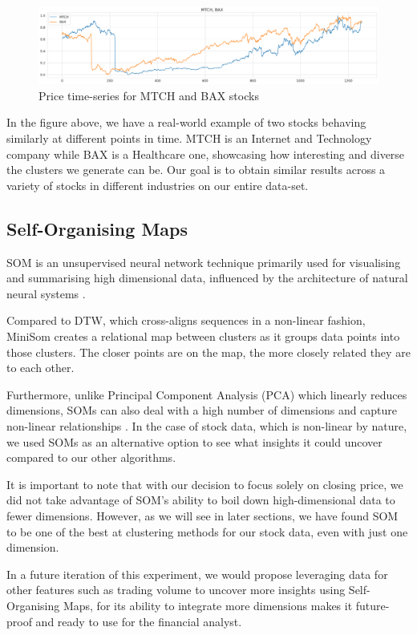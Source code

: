 \documentclass[11pt]{article}
\begin{document}
\begin{figure}[H] 
\centering
\includegraphics[width=12cm]{img/mtch-bax.png} 
\caption{Price time-series for MTCH and BAX stocks}
\label{fig:mtch-bax}
\end{figure}

In the figure above, we have a real-world example of two stocks behaving similarly at different points in time. MTCH is an Internet and Technology company while BAX is a Healthcare one, showcasing how interesting and diverse the clusters we generate can be. Our goal is to obtain similar results across a variety of stocks in different industries on our entire data-set. 

\subsection{Self-Organising Maps}

 SOM is an unsupervised neural network technique primarily used for visualising and summarising high dimensional data, influenced by the architecture of natural neural systems \cite{somBackground}.

 Compared to DTW, which cross-aligns sequences in a non-linear fashion, MiniSom creates a relational map between clusters as it groups data points into those clusters. The closer points are on the map, the more closely related they are to each other. 
 
 Furthermore, unlike Principal Component Analysis (PCA) which linearly reduces dimensions, SOMs can also deal with a high number of dimensions and capture non-linear relationships \cite{pcaSom}. In the case of stock data, which is non-linear by nature, we used SOMs as an alternative option to see what insights it could uncover compared to our other algorithms.

  It is important to note that with our decision to focus solely on closing price, we did not take advantage of SOM's ability to boil down high-dimensional data to fewer dimensions. However, as we will see in later sections, we have found SOM to be one of the best at clustering methods for our stock data, even with just one dimension. 
  
  In a future iteration of this experiment, we would propose leveraging data for other features such as trading volume to uncover more insights using Self-Organising Maps, for its ability to integrate more dimensions makes it future-proof and ready to use for the financial analyst.
\end{document}
